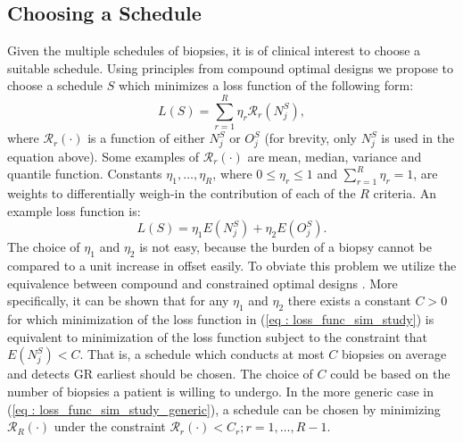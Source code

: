 \subsection{Choosing a Schedule}
\label{subsec : optimal_schedule}
Given the multiple schedules of biopsies, it is of clinical interest to choose a suitable schedule. Using principles from compound optimal designs \citep{lauter1976optimal} we propose to choose a schedule $S$ which minimizes a loss function of the following form:
\begin{equation}
\label{eq : loss_func_sim_study_generic}
L(S) = \sum_{r=1}^R \eta_r \mathcal{R}_r(N^S_j),
\end{equation}
where $\mathcal{R}_r(\cdot)$ is a function of either $N^S_j$ or $O^S_j$ (for brevity, only $N^S_j$ is used in the equation above). Some examples of $\mathcal{R}_r(\cdot)$ are mean, median, variance and quantile function. Constants $\eta_1, \ldots, \eta_R$, where $0 \leq \eta_r \leq 1$ and $\sum_{r=1}^R \eta_r = 1$, are weights to differentially weigh-in the contribution of each of the $R$ criteria. An example loss function is:
\begin{equation}
\label{eq : loss_func_sim_study}
L(S) = \eta_1 E(N^S_j) + \eta_2 E(O^S_j).
\end{equation}
The choice of $\eta_1$ and $\eta_2$ is not easy, because the burden of a biopsy cannot be compared to a unit increase in offset easily. To obviate this problem we utilize the equivalence between compound and constrained optimal designs \citep{cook1994equivalence}. More specifically, it can be shown that for any $\eta_1$ and $\eta_2$ there exists a constant $C>0$ for which minimization of the loss function in (\ref{eq : loss_func_sim_study}) is equivalent to minimization of the loss function subject to the constraint that $E(N^S_j) < C$. That is, a schedule which conducts at most $C$ biopsies on average and detects GR earliest should be chosen. The choice of $C$ could be based on the number of biopsies a patient is willing to undergo. In the more generic case in (\ref{eq : loss_func_sim_study_generic}), a schedule can be chosen by minimizing $\mathcal{R}_R(\cdot)$ under the constraint $\mathcal{R}_r(\cdot) < C_r; r=1, \ldots, R-1$.